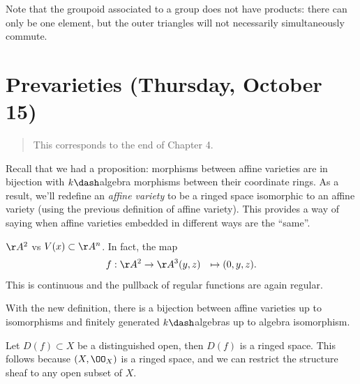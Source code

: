 \begin{remark}

Note that the groupoid associated to a group does not have products:
there can only be one element, but the outer triangles will not
necessarily simultaneously commute.

\end{remark}

\hypertarget{prevarieties-thursday-october-15}{%
\section{Prevarieties (Thursday, October
15)}\label{prevarieties-thursday-october-15}}

\begin{quote}
This corresponds to the end of Chapter 4.
\end{quote}

Recall that we had a proposition: morphisms between affine varieties are
in bijection with \(k\dash\)algebra morphisms between their coordinate
rings. As a result, we'll redefine an \emph{affine variety} to be a
ringed space isomorphic to an affine variety (using the previous
definition of affine variety). This provides a way of saying when affine
varieties embedded in different ways are the ``same''.

\begin{example}

\(\AA^2\) vs \(V(x) \subset \AA^n\). In fact, the map
\begin{align*}  
f: \AA^2 &\to \AA^3
(y,z) &\mapsto (0, y, z)
.\end{align*} This is continuous and the pullback of regular functions
are again regular.

\end{example}

\begin{remark}

With the new definition, there is a bijection between affine varieties
up to isomorphisms and finitely generated \(k\dash\)algebras up to
algebra isomorphism.

\end{remark}

\begin{proposition}

Let \(D(f) \subset X\) be a distinguished open, then \(D(f)\) is a
ringed space. This follows because \((X, \OO_X)\) is a ringed space, and
we can restrict the structure sheaf to any open subset of \(X\).

\end{proposition}

